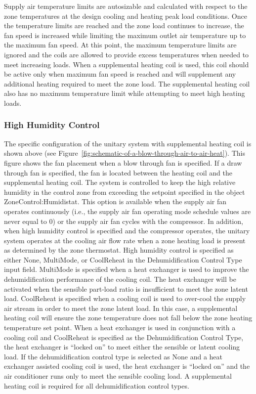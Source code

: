 Supply air temperature limits are autosizable and calculated with respect to the zone temperatures at the design cooling and heating peak load conditions. Once the temperature limits are reached and the zone load continues to increase, the fan speed is increased while limiting the maximum outlet air temperature up to the maximum fan speed. At this point, the maximum temperature limits are ignored and the coils are allowed to provide excess temperatures when needed to meet increasing loads. When a supplemental heating coil is used, this coil should be active only when maximum fan speed is reached and will supplement any additional heating required to meet the zone load. The supplemental heating coil also has no maximum temperature limit while attempting to meet high heating loads.

\subsubsection{High Humidity Control}\label{high-humidity-control}

The specific configuration of the unitary system with supplemental heating coil is shown above (see Figure~\ref{fig:schematic-of-a-blow-through-air-to-air-heat}). This figure shows the fan placement when a blow through fan is specified. If a draw through fan is specified, the fan is located between the heating coil and the supplemental heating coil. The system is controlled to keep the high relative humidity in the control zone from exceeding the setpoint specified in the object ZoneControl:Humidistat. This option is available when the supply air fan operates continuously (i.e., the supply air fan operating mode schedule values are never equal to 0) or the supply air fan cycles with the compressor. In addition, when high humidity control is specified and the compressor operates, the unitary system operates at the cooling air flow rate when a zone heating load is present as determined by the zone thermostat. High humidity control is specified as either None, MultiMode, or CoolReheat in the Dehumidification Control Type input field. MultiMode is specified when a heat exchanger is used to improve the dehumidification performance of the cooling coil. The heat exchanger will be activated when the sensible part-load ratio is insufficient to meet the zone latent load. CoolReheat is specified when a cooling coil is used to over-cool the supply air stream in order to meet the zone latent load. In this case, a supplemental heating coil will ensure the zone temperature does not fall below the zone heating temperature set point. When a heat exchanger is used in conjunction with a cooling coil and CoolReheat is specified as the Dehumidification Control Type, the heat exchanger is ``locked on'' to meet either the sensible or latent cooling load. If the dehumidification control type is selected as None and a heat exchanger assisted cooling coil is used, the heat exchanger is ``locked on'' and the air conditioner runs only to meet the sensible cooling load. A supplemental heating coil is required for all dehumidification control types.


